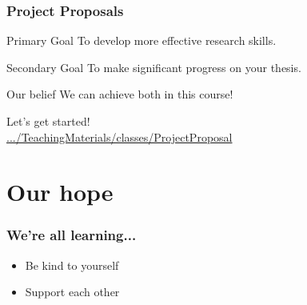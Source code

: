 \documentclass{beamer}
\begin{document}
\begin{frame}
    \frametitle{Project Proposals}

    \begin{block}{Primary Goal}
        To develop more effective research skills.
    \end{block}

    \begin{block}{Secondary Goal}
        To make significant progress on your thesis.
    \end{block}

    \begin{block}{Our belief}
        We can achieve both in this course!
    \end{block}

Let's get started!\\
        \href{https://github.com/analyticalworkflows/TeachingMaterials/tree/master/classes/ProjectProposal}{.../TeachingMaterials/classes/ProjectProposal}


\end{frame}


\section{Our hope}


\begin{frame}
    \frametitle{We're all learning...}



    \begin{itemize}
        \item Be kind to yourself
        \item Support each other
    \end{itemize}

	\bigskip


\end{frame}
\end{document}
